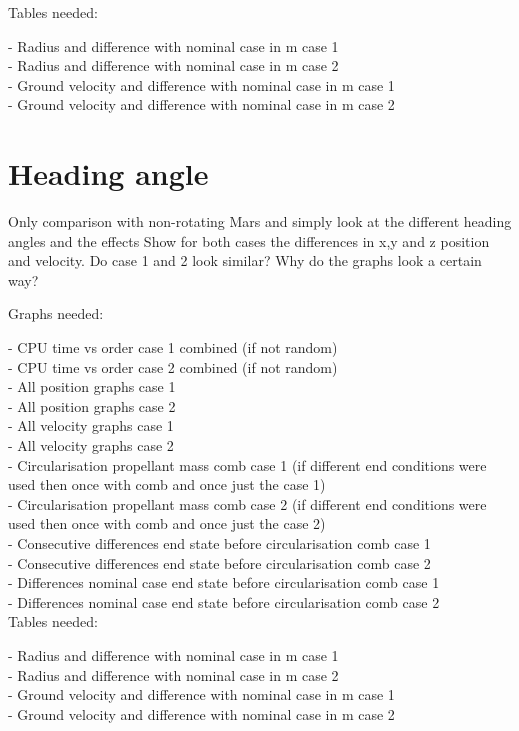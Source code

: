 Tables needed:

- Radius and difference with nominal case in m case 1 \\
- Radius and difference with nominal case in m case 2 \\
- Ground velocity and difference with nominal case in m case 1 \\
- Ground velocity and difference with nominal case in m case 2 \\

\section{Heading angle}
\label{sec:headingAngle}

Only comparison with non-rotating Mars and simply look at the different heading angles and the effects
Show for both cases the differences in x,y and z position and velocity. Do case 1 and 2 look similar? Why do the graphs look a certain way?

Graphs needed:

- CPU time vs order case 1 combined (if not random) \\
- CPU time vs order case 2 combined (if not random) \\
- All position graphs case 1 \\
- All position graphs case 2 \\
- All velocity graphs case 1 \\
- All velocity graphs case 2 \\

- Circularisation propellant mass comb case 1 (if different end conditions were used then once with comb and once just the case 1) \\
- Circularisation propellant mass comb case 2 (if different end conditions were used then once with comb and once just the case 2) \\
- Consecutive differences end state before circularisation comb case 1 \\
- Consecutive differences end state before circularisation comb case 2 \\
- Differences nominal case end state before circularisation comb case 1 \\
- Differences nominal case end state before circularisation comb case 2 \\


Tables needed:

- Radius and difference with nominal case in m case 1 \\
- Radius and difference with nominal case in m case 2 \\
- Ground velocity and difference with nominal case in m case 1 \\
- Ground velocity and difference with nominal case in m case 2 \\
